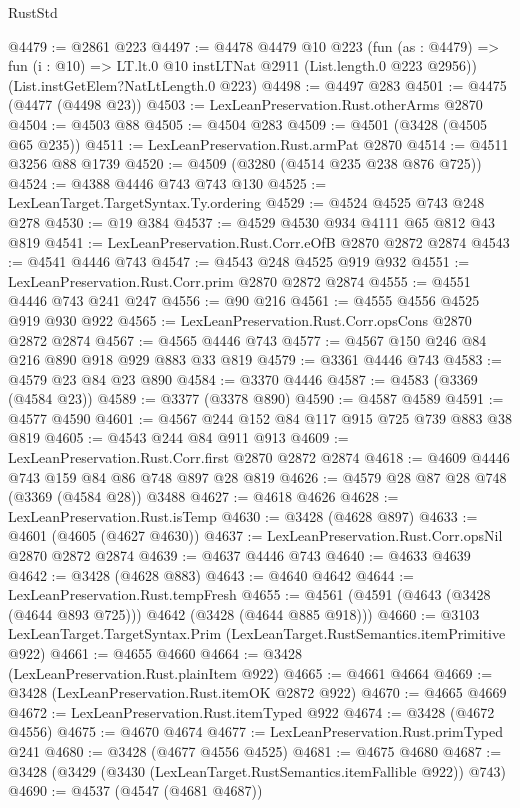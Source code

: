 \begin{lexlean}{RustStd}
\begin{coremodule}
@4479 := @2861 @223
@4497 := @4478
    @4479
    @10
    @223
    (fun (as : @4479) =>
    fun (i : @10) => LT.lt.{0} @10 instLTNat @2911 (List.length.{0} @223 @2956))
    (List.instGetElem?NatLtLength.{0} @223)
@4498 := @4497 @283
@4501 := @4475 (@4477 (@4498 @23))
@4503 := LexLeanPreservation.Rust.otherArms @2870
@4504 := @4503 @88
@4505 := @4504 @283
@4509 := @4501 (@3428 (@4505 @65 @235))
@4511 := LexLeanPreservation.Rust.armPat @2870
@4514 := @4511 @3256 @88 @1739
@4520 := @4509 (@3280 (@4514 @235 @238 @876 @725))
@4524 := @4388 @4446 @743 @743 @130
@4525 := LexLeanTarget.TargetSyntax.Ty.ordering
@4529 := @4524 @4525 @743 @248 @278
@4530 := @19 @384
@4537 := @4529 @4530 @934 @4111 @65 @812 @43 @819
@4541 := LexLeanPreservation.Rust.Corr.eOfB @2870 @2872 @2874
@4543 := @4541 @4446 @743
@4547 := @4543 @248 @4525 @919 @932
@4551 := LexLeanPreservation.Rust.Corr.prim @2870 @2872 @2874
@4555 := @4551 @4446 @743 @241 @247
@4556 := @90 @216
@4561 := @4555 @4556 @4525 @919 @930 @922
@4565 := LexLeanPreservation.Rust.Corr.opsCons @2870 @2872 @2874
@4567 := @4565 @4446 @743
@4577 := @4567 @150 @246 @84 @216 @890 @918 @929 @883 @33 @819
@4579 := @3361 @4446 @743
@4583 := @4579 @23 @84 @23 @890
@4584 := @3370 @4446
@4587 := @4583 (@3369 (@4584 @23))
@4589 := @3377 (@3378 @890)
@4590 := @4587 @4589
@4591 := @4577 @4590
@4601 := @4567 @244 @152 @84 @117 @915 @725 @739 @883 @38 @819
@4605 := @4543 @244 @84 @911 @913
@4609 := LexLeanPreservation.Rust.Corr.first @2870 @2872 @2874
@4618 := @4609 @4446 @743 @159 @84 @86 @748 @897 @28 @819
@4626 := @4579 @28 @87 @28 @748 (@3369 (@4584 @28)) @3488
@4627 := @4618 @4626
@4628 := LexLeanPreservation.Rust.isTemp
@4630 := @3428 (@4628 @897)
@4633 := @4601 (@4605 (@4627 @4630))
@4637 := LexLeanPreservation.Rust.Corr.opsNil @2870 @2872 @2874
@4639 := @4637 @4446 @743
@4640 := @4633 @4639
@4642 := @3428 (@4628 @883)
@4643 := @4640 @4642
@4644 := LexLeanPreservation.Rust.tempFresh
@4655 := @4561 (@4591 (@4643 (@3428 (@4644 @893 @725))) @4642 (@3428 (@4644 @885 @918)))
@4660 := @3103 LexLeanTarget.TargetSyntax.Prim (LexLeanTarget.RustSemantics.itemPrimitive @922)
@4661 := @4655 @4660
@4664 := @3428 (LexLeanPreservation.Rust.plainItem @922)
@4665 := @4661 @4664
@4669 := @3428 (LexLeanPreservation.Rust.itemOK @2872 @922)
@4670 := @4665 @4669
@4672 := LexLeanPreservation.Rust.itemTyped @922
@4674 := @3428 (@4672 @4556)
@4675 := @4670 @4674
@4677 := LexLeanPreservation.Rust.primTyped @241
@4680 := @3428 (@4677 @4556 @4525)
@4681 := @4675 @4680
@4687 := @3428 (@3429 (@3430 (LexLeanTarget.RustSemantics.itemFallible @922)) @743)
@4690 := @4537 (@4547 (@4681 @4687))

\end{coremodule}
\end{lexlean}
